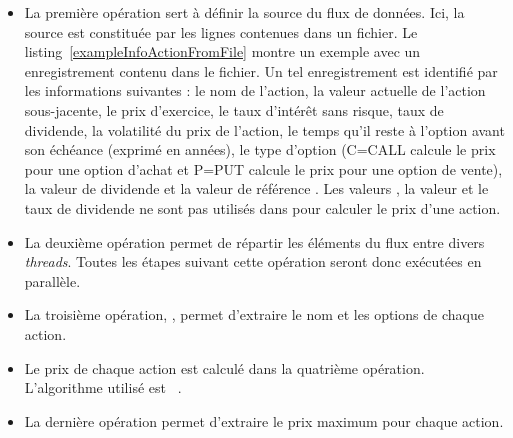 \begin{itemize}

\item La premi\`ere op\'eration sert \`a d\'efinir la source du flux de donn\'ees. Ici, la source est constitu\'ee par les lignes contenues dans un fichier. Le listing~\ref{exampleInfoActionFromFile} montre un exemple avec un enregistrement contenu dans le fichier. Un tel enregistrement est identifi\'e par les informations suivantes : le nom de l'action, la valeur actuelle de l'action sous-jacente, le prix d'exercice, le taux d'int\'er\^et sans risque, taux de dividende, la volatilit\'e du prix de l'action, le temps qu'il reste \`a l'option avant son \'ech\'eance (exprim\'e en ann\'ees), le type d'option (C=CALL calcule le prix pour une option d'achat et P=PUT calcule le prix pour une option de vente), la valeur de dividende et la valeur de r\'ef\'erence . 
Les valeurs , la valeur et le taux de dividende ne sont pas utilis\'es dans  pour calculer le prix d'une action.






\item La deuxi\`eme op\'eration permet de r\'epartir les \'el\'ements du flux entre divers \emph{threads}.
Toutes les \'etapes suivant cette op\'eration seront donc ex\'ecut\'ees en parall\`ele.

\item La troisi\`eme op\'eration,  , permet d'extraire le nom et les options de chaque action.



\item  Le prix de chaque action est calcul\'e dans la quatri\`eme op\'eration. L'algorithme utilis\'e est ~\cite{macbeth1979empirical}. 



\item La derni\`ere op\'eration permet d'extraire le prix maximum pour chaque action.


\end{itemize}

